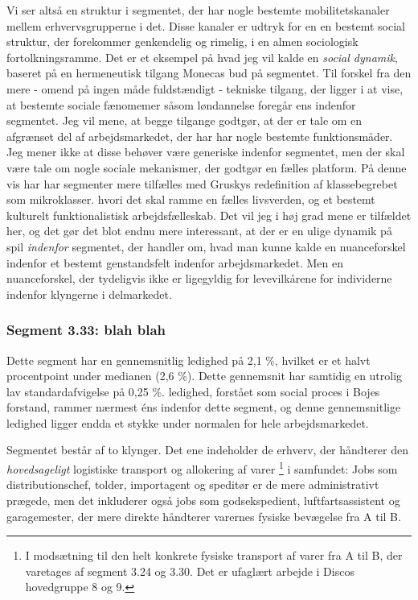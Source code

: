 Vi ser altså en struktur i segmentet, der har nogle bestemte mobilitetskanaler mellem erhvervsgrupperne i det. Disse kanaler er udtryk for en en bestemt social struktur, der forekommer genkendelig og rimelig, i en almen sociologisk fortolkningsramme. Det er et eksempel på hvad jeg vil kalde en \emph{social dynamik}, baseret på en hermeneutisk tilgang Monecas bud på segmentet. Til forskel fra den mere - omend på ingen måde fuldstændigt - tekniske tilgang, der ligger i at vise, at bestemte sociale fænomemer såsom løndannelse foregår ens indenfor segmentet. Jeg vil mene, at begge tilgange godtgør, at der er tale om en afgrænset del af arbejdsmarkedet, der har har nogle bestemte funktionsmåder. Jeg mener ikke at disse behøver være generiske indenfor segmentet, men der skal være tale om nogle sociale mekanismer, der godtgør en fælles platform. På denne vis har har segmenter mere tilfælles med Gruskys redefinition af klassebegrebet som mikroklasser. hvori det skal ramme en fælles livsverden, og et bestemt kulturelt funktionalistisk arbejdsfælleskab. Det vil jeg i høj grad mene er tilfældet her, og det gør det blot endnu mere interessant, at der er en ulige dynamik på spil \emph{indenfor} segmentet, der handler om, hvad man kunne kalde en nuanceforskel indenfor et bestemt genstandsfelt indenfor arbejdsmarkedet. Men en nuanceforskel, der tydeligvis ikke er ligegyldig for levevilkårene for individerne indenfor klyngerne i delmarkedet.


%
\subsubsection{Segment 3.33: blah blah }
%


Dette segment har en gennemsnitlig ledighed på 2,1 \%, hvilket er et halvt procentpoint under medianen (2,6 \%). Dette gennemsnit har samtidig en utrolig lav standardafvigelse på 0,25 \%. ledighed, forstået som social proces i Bojes forstand, rammer nærmest éns indenfor dette segment, og denne gennemsnitlige ledighed ligger endda et stykke under normalen for hele arbejdsmarkedet. 

Segmentet består af to klynger. Det ene indeholder de erhverv, der håndterer den \emph{hovedsageligt} logistiske transport og allokering af varer%
%
\footnote{ I modsætning til den helt konkrete fysiske transport af varer fra A til B, der varetages af segment 3.24 og 3.30. Det er ufaglært arbejde i Discos hovedgruppe 8 og 9.}%
%
 i samfundet: Jobs som distributionschef, tolder, importagent og speditør er de mere administrativt prægede, men det inkluderer også jobs som godsekspedient, luftfartsassistent og garagemester, der mere direkte håndterer varernes fysiske bevægelse fra A til B.


